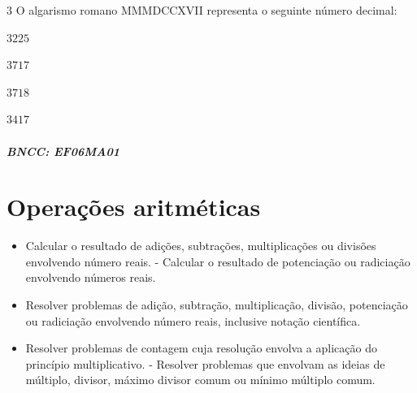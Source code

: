 {%

\num{3}  O algarismo romano MMMDCCXVII representa o seguinte número decimal:

\begin{escolha}
\item $3225$
\item $3717$
\item $3718$
\item $3417$
\end{escolha}

\paragraph{BNCC: EF06MA01 }



\chapter{Operações aritméticas}

\begin{itemize}
\item Calcular o resultado de adições, subtrações,
multiplicações ou divisões envolvendo número reais. - Calcular o
resultado de potenciação ou radiciação envolvendo números reais.
\item Resolver problemas de adição, subtração, multiplicação, divisão,
  potenciação ou radiciação envolvendo número reais, inclusive notação
  científica.
\item Resolver problemas de contagem cuja resolução envolva a aplicação do
  princípio multiplicativo. - Resolver problemas que envolvam as ideias
  de múltiplo, divisor, máximo divisor comum ou mínimo múltiplo comum.
\end{itemize}

}

